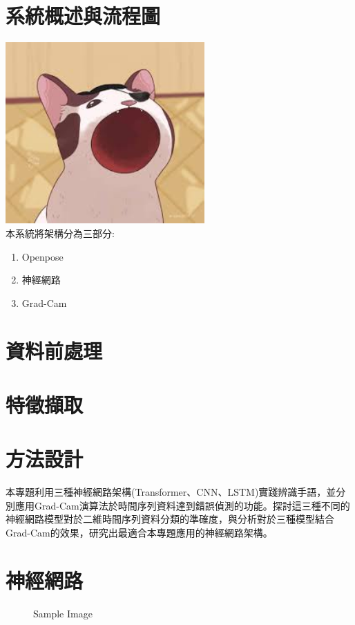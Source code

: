 \documentclass[12pt,a4paper]{report}
\begin{document}
\begin{CJK*}{UTF8}{bkai}
    \section{系統概述與流程圖}
    \par
    \includegraphics[width=3in]{demo.jpg}\\
    本系統將架構分為三部分:
    \begin{enumerate}
        \item Openpose
        \item 神經網路
        \item Grad-Cam
    \end{enumerate}

    \section{資料前處理}
    \section{特徵擷取}
    \section{方法設計}
    \par
    本專題利用三種神經網路架構(Transformer、CNN、LSTM)實踐辨識手語，並分別應用Grad-Cam演算法於時間序列資料達到錯誤偵測的功能。探討這三種不同的神經網路模型對於二維時間序列資料分類的準確度，與分析對於三種模型結合Grad-Cam的效果，研究出最適合本專題應用的神經網路架構。

    \section{神經網路}
    \begin{figure}[H]
        \centering
        \caption{Sample Image}
        \label{fig:sample image}
    \end{figure}


\end{CJK*}
\end{document}
